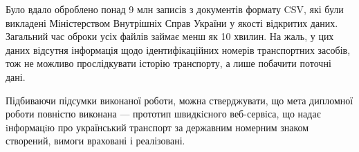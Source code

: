 Було вдало оброблено понад 9 млн записів з документів формату CSV,
які були викладені Міністерством Внутрішніх Справ України у якості відкритих даних.
Загальний час оброки усіх файлів займає менш як 10 хвилин.
На жаль, у цих даних відсутня інформація щодо ідентифікаційних
номерів транспортних засобів, тож не можливо
прослідкувати історію транспорту, а лише побачити поточні дані.

Підбиваючи підсумки виконаної роботи, можна стверджувати, що мета
дипломної роботи повністю виконана — прототип швидкiсного веб-сервiса,
що надає iнформацiю про український транспорт за державним номерним знаком створений,
вимоги враховані і реалізовані.